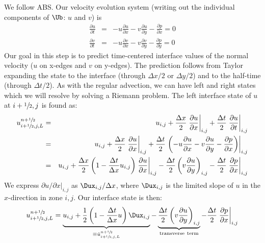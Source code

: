 We follow ABS.  Our velocity evolution system (writing out the
individual components of $\Ub$: $u$ and $v$) is
\begin{eqnarray}
\frac{\partial u}{\partial t} &=& -u \frac{\partial u}{\partial x}
                                  -v \frac{\partial u}{\partial y}
                                  -\frac{\partial p}{\partial x} = 0 \\
\frac{\partial v}{\partial t} &=& -u \frac{\partial v}{\partial x}
                                  -v \frac{\partial v}{\partial y}
                                  -\frac{\partial p}{\partial y} = 0
\end{eqnarray}
Our goal in this step is to predict time-centered interface values of
the normal velocity ($u$ on x-edges and $v$ on y-edges).  The
prediction follows from Taylor expanding the state to the interface
(through $\Delta x/2$ or $\Delta y/2$) and to the half-time (through
$\Delta t/2$).  As with the regular advection, we can have left and
right states which we will resolve by solving a Riemann problem.  The
left interface state of $u$ at $i+{\sfrac{1}{2}},j$ is found as:
\begin{eqnarray}
u_{i+{\sfrac{1}{2}},j,L}^{n+{\sfrac{1}{2}}}
  &=& u_{i,j}
    + \frac{\Delta x}{2} \left . \frac{\partial u}{\partial x} \right |_{i,j}
    + \frac{\Delta t}{2} \left . \frac{\partial u}{\partial t} \right |_{i,j}\\
  &=& u_{i,j}
    + \frac{\Delta x}{2} \left . \frac{\partial u}{\partial x} \right |_{i,j}
    + \frac{\Delta t}{2} \left . \left (-u \frac{\partial u}{\partial x}
                                -v \frac{\partial u}{\partial y}
                                -\frac{\partial p}{\partial x} \right ) \right |_{i,j}\\
  &=& u_{i,j}
    + \frac{\Delta x}{2} \left ( 1 - \frac{\Delta t}{\Delta x} u_{i,j} \right )
                         \left .  \frac{\partial u}{\partial x}\right |_{i,j}
    - \frac{\Delta t}{2} \left ( v \frac{\partial u}{\partial y}\right )_{i,j}
    - \frac{\Delta t}{2} \left . \frac{\partial p}{\partial x} \right |_{i,j}\\
\end{eqnarray}
We express ${\partial u}/{\partial x} |_{i,j}$ as $\Dux_{i,j} / \Delta
x$, where $\Dux_{i,j}$ is the limited slope of $u$ in the
$x$-direction in zone $i,j$.  Our interface state is then:
\begin{equation}
u_{i+\myhalf,j,L}^{n+\myhalf}
    = \underbrace{u_{i,j} + \frac{1}{2} \left ( 1 - \frac{\Delta t}{\Delta x} u \right ) \Dux_{i,j}}_{\equiv \hat{u}_{i+\myhalf,j,L}^{n+\myhalf}}
    - \underbrace{\frac{\Delta t}{2} \left ( v \frac{\partial u}{\partial y} \right )_{i,j}}_{\mathrm{transverse~term}}
    - \frac{\Delta t}{2} \left . \frac{\partial p}{\partial x} \right |_{i,j}
\label{eq:uMAC_l}
\end{equation}


